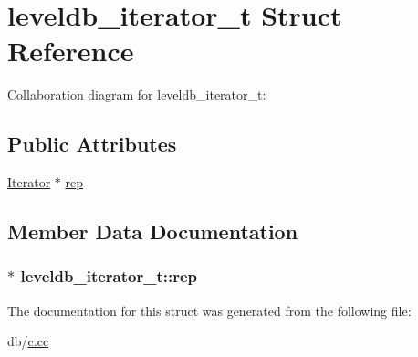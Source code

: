 \hypertarget{structleveldb__iterator__t}{\section{leveldb\-\_\-iterator\-\_\-t Struct Reference}
\label{structleveldb__iterator__t}
}


Collaboration diagram for leveldb\-\_\-iterator\-\_\-t\-:
\subsection*{Public Attributes}
\begin{DoxyCompactItemize}
\item 
\hyperlink{classleveldb_1_1_iterator}{Iterator} $\ast$ \hyperlink{structleveldb__iterator__t_a051a1df01c49d34f34628ae1467f9377}{rep}
\end{DoxyCompactItemize}


\subsection{Member Data Documentation}
\hypertarget{structleveldb__iterator__t_a051a1df01c49d34f34628ae1467f9377}{
\subsubsection[{rep}]{$\ast$ leveldb\-\_\-iterator\-\_\-t\-::rep}}\label{structleveldb__iterator__t_a051a1df01c49d34f34628ae1467f9377}


The documentation for this struct was generated from the following file\-:\begin{DoxyCompactItemize}
\item 
db/\hyperlink{c_8cc}{c.\-cc}\end{DoxyCompactItemize}
